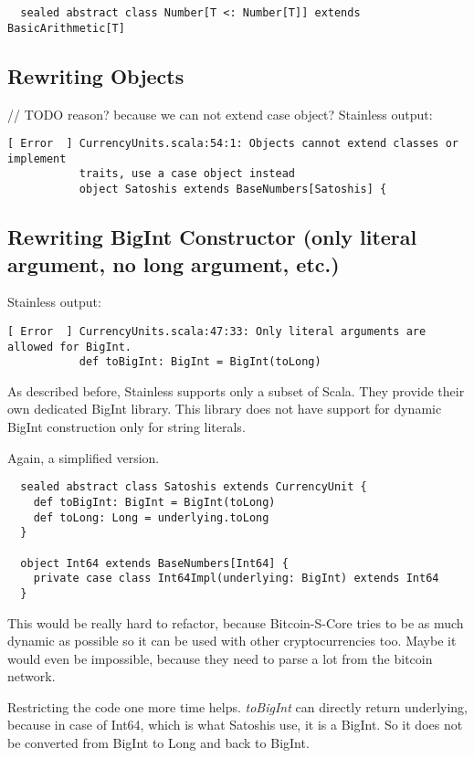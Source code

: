 \begin{lstlisting}
  sealed abstract class Number[T <: Number[T]] extends BasicArithmetic[T]  
\end{lstlisting}

\subsection{Rewriting Objects}
// TODO reason? because we can not extend case object?
Stainless output:
\begin{lstlisting}
[ Error  ] CurrencyUnits.scala:54:1: Objects cannot extend classes or implement
           traits, use a case object instead
           object Satoshis extends BaseNumbers[Satoshis] {
\end{lstlisting}

\subsection{Rewriting BigInt Constructor (only literal argument, no long argument, etc.)}
Stainless output:
\begin{lstlisting}
[ Error  ] CurrencyUnits.scala:47:33: Only literal arguments are allowed for BigInt.
           def toBigInt: BigInt = BigInt(toLong)
\end{lstlisting}
As described before, Stainless supports only a subset of Scala.
They provide their own dedicated BigInt library.
This library does not have support for dynamic BigInt construction only for string literals.

Again, a simplified version.
\begin{lstlisting}
  sealed abstract class Satoshis extends CurrencyUnit {
    def toBigInt: BigInt = BigInt(toLong)
    def toLong: Long = underlying.toLong
  }

  object Int64 extends BaseNumbers[Int64] {
    private case class Int64Impl(underlying: BigInt) extends Int64
  }
\end{lstlisting}
This would be really hard to refactor, because Bitcoin-S-Core tries to be as much dynamic as possible so it can be used with other cryptocurrencies too.
Maybe it would even be impossible, because they need to parse a lot from the bitcoin network.

Restricting the code one more time helps.
\emph{toBigInt} can directly return underlying, because in case of Int64, which is what Satoshis use, it is a BigInt.
So it does not be converted from BigInt to Long and back to BigInt.

